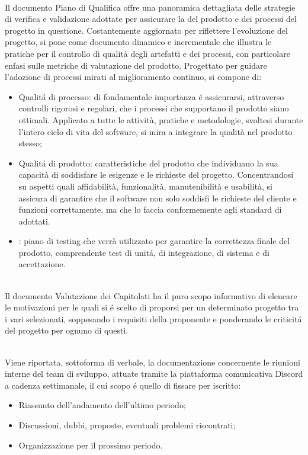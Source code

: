 \\
Il documento Piano di Qualifica offre una panoramica dettagliata delle strategie di verifica e validazione adottate per assicurare la  del prodotto e dei processi del progetto in questione. Costantemente aggiornato per riflettere l'evoluzione del progetto, si pone come documento dinamico e incrementale che illustra le pratiche per il controllo di qualità degli artefatti e dei processi, con particolare enfasi sulle metriche di valutazione del prodotto. Progettato per guidare l'adozione di processi mirati al miglioramento continuo, si compone di:
\begin{itemize}
    \item Qualitá di processo: di fondamentale importanza é assicurarsi, attraverso controlli rigorosi e regolari, che i processi che supportano il prodotto siano ottimali. Applicato a tutte le attività, pratiche e metodologie, svoltesi durante l'intero ciclo di vita del software, si mira a integrare la qualità nel prodotto stesso;
    \item Qualitá di prodotto: caratteristiche del prodotto che individuano la sua capacità di soddisfare le esigenze e le richieste del progetto. Concentrandosi su aspetti quali affidabilità, funzionalità, manutenibilità e usabilità, si assicura di garantire che il software non solo soddisfi le richieste del cliente e funzioni correttamente, ma che lo faccia conformemente agli standard di  adottati.
    \item {}: piano di testing che verrà utilizzato per garantire la correttezza finale del prodotto, comprendente test di unitá, di integrazione, di sistema e di accettazione.
\end{itemize} 

\\
Il documento Valutazione dei Capitolati ha il puro scopo informativo di elencare le motivazioni per le quali si é scelto di proporsi per un determinato progetto tra i vari selezionati, soppesando i requisiti della proponente e ponderando le criticitá del progetto per ognuno di questi.  

\\
Viene riportata, sottoforma di verbale, la documentazione concernente le riunioni interne del team di sviluppo, attuate tramite la piattaforma comunicativa Discord a cadenza settimanale, il cui scopo é quello di fissare per iscritto:
\begin{itemize}
    \item Riassunto dell'andamento dell'ultimo periodo;
    \item Discussioni, dubbi, proposte, eventuali problemi riscontrati;
    \item Organizzazione per il prossimo periodo.
\end{itemize}

